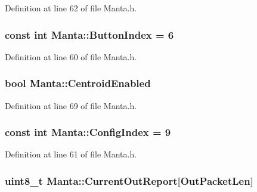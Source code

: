 \-Definition at line 62 of file \-Manta.\-h.

\hypertarget{classManta_a8316d17328d2d50f1e87940d8228c18e}{
\subsubsection[{\-Button\-Index}]{\setlength{\rightskip}{0pt plus 5cm}const int {\bf \-Manta\-::\-Button\-Index} = 6}}\label{classManta_a8316d17328d2d50f1e87940d8228c18e}


\-Definition at line 60 of file \-Manta.\-h.

\hypertarget{classManta_a0db6605ab921fe05ce67a0dfef004591}{
\subsubsection[{\-Centroid\-Enabled}]{\setlength{\rightskip}{0pt plus 5cm}bool {\bf \-Manta\-::\-Centroid\-Enabled}}}\label{classManta_a0db6605ab921fe05ce67a0dfef004591}


\-Definition at line 69 of file \-Manta.\-h.

\hypertarget{classManta_ae651e21fe2506164f9f0a011e740b889}{
\subsubsection[{\-Config\-Index}]{\setlength{\rightskip}{0pt plus 5cm}const int {\bf \-Manta\-::\-Config\-Index} = 9}}\label{classManta_ae651e21fe2506164f9f0a011e740b889}


\-Definition at line 61 of file \-Manta.\-h.

\hypertarget{classManta_aeaac3f532708dd87197c963a5a9ee5d4}{
\subsubsection[{\-Current\-Out\-Report}]{\setlength{\rightskip}{0pt plus 5cm}uint8\-\_\-t {\bf \-Manta\-::\-Current\-Out\-Report}\mbox{[}{\bf \-Out\-Packet\-Len}\mbox{]}}}\label{classManta_aeaac3f532708dd87197c963a5a9ee5d4}


